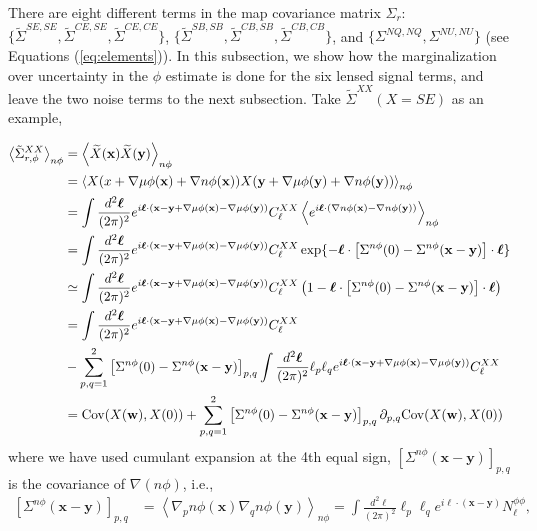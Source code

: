 \documentclass[aps, prd, reprint, nofootinbib, groupedaddress, showpacs]{revtex4-1}
\def\be{\begin{equation}}
\def\ee{\end{equation}}
\newcommand*\Bell{\ensuremath{\boldsymbol\ell}}
\begin{document}
There are eight different terms in the map covariance matrix $\Sigma_r$:
$\{ \tilde\Sigma^{SE,SE},\tilde\Sigma^{CE,SE},\tilde\Sigma^{CE,CE} \}$,
$\{ \tilde\Sigma^{SB,SB},\tilde\Sigma^{CB,SB},\tilde\Sigma^{CB,CB} \}$,
and $\{ \Sigma^{NQ,NQ},\Sigma^{NU,NU} \}$ (see Equations (\ref{eq:elements})).
In this subsection, we show how the marginalization over uncertainty in the $\phi$ estimate
is done for the six lensed signal terms,
and leave the two noise terms to the next subsection.
Take $\tilde\Sigma^{XX} (X = SE)$ as an example,
\begin{widetext}
\be
\begin{aligned}
\left<\tilde\Sigma^{XX}_{r,\phi} \right>_{n\phi}
& = \left<\widetilde X(\mathbf x) \widetilde X(\mathbf y)  \right>_{n\phi} \\
& = \left<X(x + \nabla \mu\phi(\mathbf x) + \nabla n\phi(\mathbf x))
 X(\mathbf y + \nabla \mu\phi(\mathbf y) + \nabla n\phi(\mathbf y)) \right>_{n\phi} \\
& = \int \frac{d^2\Bell}{(2\pi)^2} e^{i \Bell\cdot (\mathbf x- \mathbf y+\nabla\mu\phi(\mathbf x) - \nabla\mu\phi(\mathbf y))}
C_\ell^{XX} \left< e^{i\Bell\cdot(\nabla n\phi(\mathbf x) -\nabla n\phi(\mathbf y))}\right>_{n\phi} \\
& = \int \frac{d^2\Bell}{(2\pi)^2} e^{i \Bell\cdot (\mathbf x-\mathbf y+\nabla\mu\phi(\mathbf x) - \nabla\mu\phi(\mathbf y))}
C_\ell^{XX} \exp\{-\Bell\cdot \left[\Sigma^{n\phi}(0)-\Sigma^{n\phi}(\mathbf x-\mathbf y)\right] \cdot \Bell\}  \\
&\simeq \int \frac{d^2\Bell}{(2\pi)^2} e^{i \Bell\cdot (\mathbf x-\mathbf y+\nabla\mu\phi(\mathbf x) - \nabla\mu\phi(\mathbf y))}
C_\ell^{XX} \left(1- \Bell\cdot \left[\Sigma^{n\phi}(0)-\Sigma^{n\phi}(\mathbf x-\mathbf y)\right] \cdot \Bell\right)  \\
& = \int \frac{d^2\Bell}{(2\pi)^2} e^{i \Bell\cdot (\mathbf x-\mathbf y+\nabla\mu\phi(\mathbf x) - \nabla\mu\phi(\mathbf y))} C_\ell^{XX}  \\
& - \sum_{p,q=1}^2 \left[\Sigma^{n\phi}(0)-\Sigma^{n\phi}(\mathbf x-\mathbf y)\right]_{p,q}
\int \frac{d^2\Bell}{(2\pi)^2} \ell_p \ell_q e^{i \Bell\cdot (\mathbf x-\mathbf y+\nabla\mu\phi(\mathbf x) - \nabla\mu\phi(\mathbf y))} C_\ell^{XX} \\
& = {\rm Cov}(X(\mathbf w), X(0))
+ \sum_{p,q=1}^2 \left[\Sigma^{n\phi}(0)-\Sigma^{n\phi}(\mathbf x-\mathbf y)\right]_{p,q}
\partial_{p,q} {\rm Cov}(X(\mathbf w), X(0))
\end{aligned}
\ee
where we have used cumulant expansion at the 4th equal sign,  $\left[\Sigma^{n\phi}(\mathbf x-\mathbf y)\right]_{p,q}$
is the covariance of $\nabla(n\phi)$, i.e.,
\be
\begin{aligned}
\label{eq:a2}
    \left[\Sigma^{n\phi}(\mathbf x-\mathbf y)\right]_{p,q}
  & = \left< \nabla_p n\phi(\mathbf x) \nabla_q n\phi(\mathbf y)\right>_{n\phi}
    = \int \frac{d^2\Bell}{(2\pi)^2} \ell_p \ell_q e^{i\Bell\cdot (\mathbf x-\mathbf y)} N_\ell^{\phi\phi},
\end{aligned}
\ee

\end{widetext}
\end{document}
